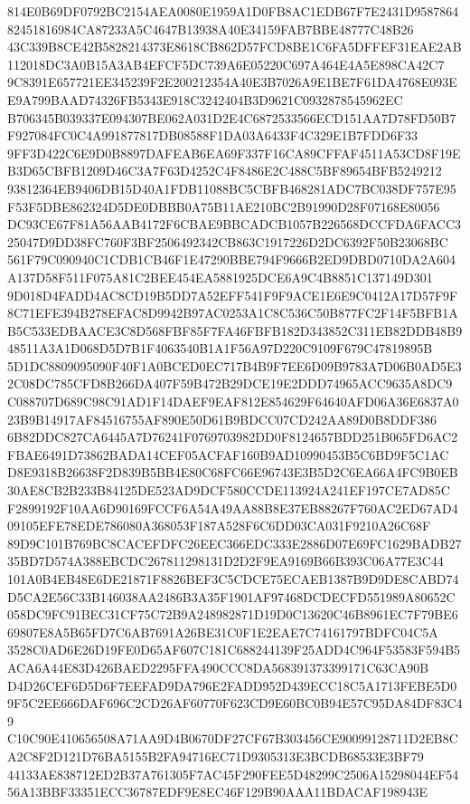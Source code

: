 \documentclass[UTF8,fontset=fandol,zihao=-4,a4paper]{ctexart}
\begin{document}
{{814E0B69DF0792BC2154AEA0080E1959A1D0FB8AC1EDB67F7E2431D958786482451816984CA87233A5C4647B13938A40E34159FAB7BBE48777C48B26
43C339B8CE42B5828214373E8618CB862D57FCD8BE1C6FA5DFFEF31EAE2AB112018DC3A0B15A3AB4EFCF5DC739A6E05220C697A464E4A5E898CA42C7
9C8391E657721EE345239F2E200212354A40E3B7026A9E1BE7F61DA4768E093EE9A799BAAD74326FB5343E918C3242404B3D9621C0932878545962EC
B706345B039337E094307BE062A031D2E4C6872533566ECD151AA7D78FD50B7F927084FC0C4A991877817DB08588F1DA03A6433F4C329E1B7FDD6F33
9FF3D422C6E9D0B8897DAFEAB6EA69F337F16CA89CFFAF4511A53CD8F19EB3D65CBFB1209D46C3A7F63D4252C4F8486E2C488C5BF89654BFB5249212
93812364EB9406DB15D40A1FDB11088BC5CBFB468281ADC7BC038DF757E95F53F5DBE862324D5DE0DBBB0A75B11AE210BC2B91990D28F07168E80056
DC93CE67F81A56AAB4172F6CBAE9BBCADCB1057B226568DCCFDA6FACC325047D9DD38FC760F3BF2506492342CB863C1917226D2DC6392F50B23068BC
561F79C090940C1CDB1CB46F1E47290BBE794F9666B2ED9DBD0710DA2A604A137D58F511F075A81C2BEE454EA5881925DCE6A9C4B8851C137149D301
9D018D4FADD4AC8CD19B5DD7A52EFF541F9F9ACE1E6E9C0412A17D57F9F8C71EFE394B278EFAC8D9942B97AC0253A1C8C536C50B877FC2F14F5BFB1A
B5C533EDBAACE3C8D568FBF85F7FA46FBFB182D343852C311EB82DDB48B948511A3A1D068D5D7B1F4063540B1A1F56A97D220C9109F679C47819895B
5D1DC8809095090F40F1A0BCED0EC717B4B9F7EE6D09B9783A7D06B0AD5E32C08DC785CFD8B266DA407F59B472B29DCE19E2DDD74965ACC9635A8DC9
C088707D689C98C91AD1F14DAEF9EAF812E854629F64640AFD06A36E6837A023B9B14917AF84516755AF890E50D61B9BDCC07CD242AA89D0B8DDF386
6B82DDC827CA6445A7D76241F0769703982DD0F8124657BDD251B065FD6AC2FBAE6491D73862BADA14CEF05ACFAF160B9AD10990453B5C6BD9F5C1AC
D8E9318B26638F2D839B5BB4E80C68FC66E96743E3B5D2C6EA66A4FC9B0EB30AE8CB2B233B84125DE523AD9DCF580CCDE113924A241EF197CE7AD85C
F2899192F10AA6D90169FCCF6A54A49AA88B8E37EB88267F760AC2ED67AD409105EFE78EDE786080A368053F187A528F6C6DD03CA031F9210A26C68F
89D9C101B769BC8CACEFDFC26EEC366EDC333E2886D07E69FC1629BADB2735BD7D574A388EBCDC267811298131D2D2F9EA9169B66B393C06A77E3C44
101A0B4EB48E6DE21871F8826BEF3C5CDCE75ECAEB1387B9D9DE8CABD74D5CA2E56C33B146038AA2486B3A35F1901AF97468DCDECFD551989A80652C
058DC9FC91BEC31CF75C72B9A248982871D19D0C13620C46B8961EC7F79BE669807E8A5B65FD7C6AB7691A26BE31C0F1E2EAE7C74161797BDFC04C5A
3528C0AD6E26D19FE0D65AF607C181C688244139F25ADD4C964F53583F594B5ACA6A44E83D426BAED2295FFA490CCC8DA568391373399171C63CA90B
D4D26CEF6D5D6F7EEFAD9DA796E2FADD952D439ECC18C5A1713FEBE5D09F5C2EE666DAF696C2CD26AF60770F623CD9E60BC0B94E57C95DA84DF83C49
C10C90E410656508A71AA9D4B0670DF27CF67B303456CE90099128711D2EB8CA2C8F2D121D76BA5155B2FA94716EC71D9305313E3BCDB68533E3BF79
44133AE838712ED2B37A761305F7AC45F290FEE5D48299C2506A15298044EF5456A13BBF33351ECC36787EDF9E8EC46F129B90AAA11BDACAF198943E
}}
\end{document}
